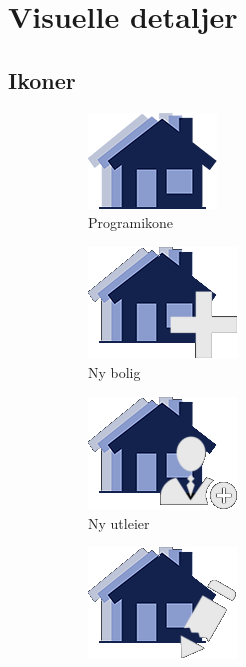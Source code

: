 \section{Visuelle detaljer}

\subsection{Ikoner}

\begin{figure}[ht!]
\centering
\begin{subfigure}[b]{0.2\textwidth}
\centering
\includegraphics[scale=0.4]{./img/produktdokumentasjon/visuelle_detaljer/boligLogo.png}
\caption{Programikone}
\end{subfigure}
\quad
\begin{subfigure}[b]{0.2\textwidth}
\centering
\includegraphics[scale=0.4]{./img/produktdokumentasjon/visuelle_detaljer/ny_bolig.png}
\caption{Ny bolig}
\end{subfigure}
\quad
\begin{subfigure}[b]{0.2\textwidth}
\centering
\includegraphics[scale=0.4]{./img/produktdokumentasjon/visuelle_detaljer/ny_utleier.png}
\caption{Ny utleier}
\end{subfigure}
\quad
\begin{subfigure}[b]{0.2\textwidth}
\centering
\includegraphics[scale=0.4]{./img/produktdokumentasjon/visuelle_detaljer/edit.png}

\end{subfigure}
\end{figure}
